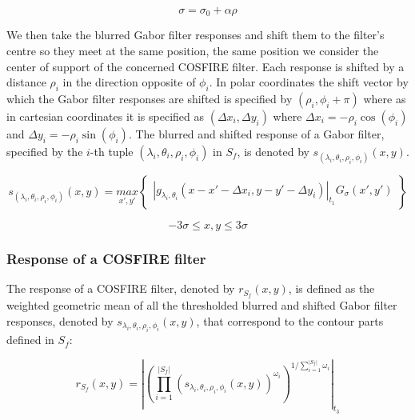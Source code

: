 \begin{equation}
 \sigma = \sigma_{0}+\alpha\rho
\end{equation}
\label{eq:gStandardDeviation}

We then take the blurred Gabor filter responses and shift them to the filter's centre so they meet at the same position, the same position we consider the center of support of the concerned COSFIRE filter. Each response is shifted by a distance $\rho_{i}$ in the direction opposite of $\phi_{i}$. In polar coordinates the shift vector by which the Gabor filter responses are shifted is specified by $(\rho_{i},\phi_{i} + \pi)$ where as in cartesian coordinates it is specified as $(\Delta x_{i},\Delta y_{i})$ where $\Delta x_{i}=-\rho_{i} \cos(\phi_{i})$ and $\Delta y_{i}=-\rho_{i} \sin(\phi_{i})$. The blurred and shifted response of a Gabor filter, specified by the $i$-th tuple $( \lambda_{i}, \theta_{i}, \rho_{i}, \phi_{i} )$ in $S_{f}$, is denoted by $s_{( \lambda_{i}, \theta_{i}, \rho_{i}, \phi_{i} )}(x,y)$.

\begin{equation}
s_{( \lambda_{i}, \theta_{i}, \rho_{i}, \phi_{i} )}(x,y) = \underset{x',y'}{max} \begin{Bmatrix*} |g_{\lambda_{i}, \theta_{i}} (x-x'-\Delta x_{i},y-y'-\Delta y_{i})|_{t_{1}} G_{\sigma}(x',y') \end{Bmatrix*}
\end{equation}

\begin{equation}
-3\sigma \leq x,y \leq 3\sigma
\end{equation}



\subsubsection{Response of a COSFIRE filter}
The response of a COSFIRE filter, denoted by $r_{S_{f}}(x,y)$, is defined as the weighted geometric mean of all the thresholded blurred and shifted Gabor filter responses, denoted by $s_{\lambda_{i}, \theta_{i}, \rho_{i}, \phi_{i}} (x,y)$, that correspond to the contour parts defined in $S_{f}$: 


\begin{equation}
r_{S_{f}}(x,y) = \left|\left(\prod_{i=1}^{|S_{f}|} \left(s_{\lambda_{i}, \theta_{i}, \rho_{i}, \phi_{i}}(x,y)\right)^{\omega_{i}}\right)^{1/\sum_{i=1}^{|S_{f}|} \omega_{i}}\right|_{t_{3}}
\end{equation}

